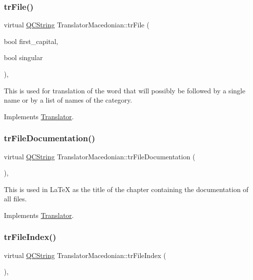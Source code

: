 \subsubsection{\texorpdfstring{trFile()}{trFile()}}
{\footnotesize\ttfamily virtual \mbox{\hyperlink{class_q_c_string}{Q\+C\+String}} Translator\+Macedonian\+::tr\+File (\begin{DoxyParamCaption}\item[{bool}]{first\+\_\+capital,  }\item[{bool}]{singular }\end{DoxyParamCaption})\hspace{0.3cm}{\ttfamily [inline]}, {\ttfamily [virtual]}}

This is used for translation of the word that will possibly be followed by a single name or by a list of names of the category. 

Implements \mbox{\hyperlink{class_translator}{Translator}}.

\mbox{\label{class_translator_macedonian_a56cadab506bd2f5987b94fbe1a7e5c6f}} 
\subsubsection{\texorpdfstring{trFileDocumentation()}{trFileDocumentation()}}
{\footnotesize\ttfamily virtual \mbox{\hyperlink{class_q_c_string}{Q\+C\+String}} Translator\+Macedonian\+::tr\+File\+Documentation (\begin{DoxyParamCaption}{ }\end{DoxyParamCaption})\hspace{0.3cm}{\ttfamily [inline]}, {\ttfamily [virtual]}}

This is used in La\+TeX as the title of the chapter containing the documentation of all files. 

Implements \mbox{\hyperlink{class_translator}{Translator}}.

\mbox{\label{class_translator_macedonian_a255b5a67cc149995c93bf3ca1444e85a}} 
\subsubsection{\texorpdfstring{trFileIndex()}{trFileIndex()}}
{\footnotesize\ttfamily virtual \mbox{\hyperlink{class_q_c_string}{Q\+C\+String}} Translator\+Macedonian\+::tr\+File\+Index (\begin{DoxyParamCaption}{ }\end{DoxyParamCaption})\hspace{0.3cm}{\ttfamily [inline]}, {\ttfamily [virtual]}}

